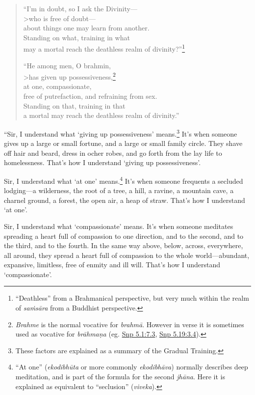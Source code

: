 \documentclass[12pt,openany]{book}%
\begin{document}
\begin{verse}%
“I’m in doubt, so I ask the Divinity—\\>who is free of doubt—\\
about things one may learn from another. \\
Standing on what, training in what \\
may a mortal reach the deathless realm of divinity?”\footnote{“Deathless” from a Brahmanical perspective, but very much within the realm of \textit{\textsanskrit{saṁsāra}} from a Buddhist perspective. } 

“He among men, O brahmin, \\>has given up possessiveness,\footnote{\textit{Brahme} is the normal vocative for \textit{\textsanskrit{brahmā}}. However in verse it is sometimes used as vocative for \textit{\textsanskrit{brāhmaṇa}} (eg. \href{https://suttacentral.net/snp5.1/en/sujato\#7.3}{Snp 5.1:7.3}, \href{https://suttacentral.net/snp5.19/en/sujato\#3.4}{Snp 5.19:3.4}). } \\
at one, compassionate, \\
free of putrefaction, and refraining from sex. \\
Standing on that, training in that \\
a mortal may reach the deathless realm of divinity.” 

%
\end{verse}

“Sir, I understand what ‘giving up possessiveness’ means.\footnote{These factors are explained as a summary of the Gradual Training. } It’s when someone gives up a large or small fortune, and a large or small family circle. They shave off hair and beard, dress in ocher robes, and go forth from the lay life to homelessness. That’s how I understand ‘giving up possessiveness’. 

Sir, I understand what ‘at one’ means.\footnote{“At one” (\textit{\textsanskrit{ekodibhūta}} or more commonly \textit{\textsanskrit{ekodibhāva}}) normally describes deep meditation, and is part of the formula for the second \textit{\textsanskrit{jhāna}}. Here it is explained as equivalent to “seclusion” (\textit{viveka}). } It’s when someone frequents a secluded lodging—a wilderness, the root of a tree, a hill, a ravine, a mountain cave, a charnel ground, a forest, the open air, a heap of straw. That’s how I understand ‘at one’. 

Sir, I understand what ‘compassionate’ means. It’s when someone meditates spreading a heart full of compassion to one direction, and to the second, and to the third, and to the fourth. In the same way above, below, across, everywhere, all around, they spread a heart full of compassion to the whole world—abundant, expansive, limitless, free of enmity and ill will. That’s how I understand ‘compassionate’. 
\end{document}
